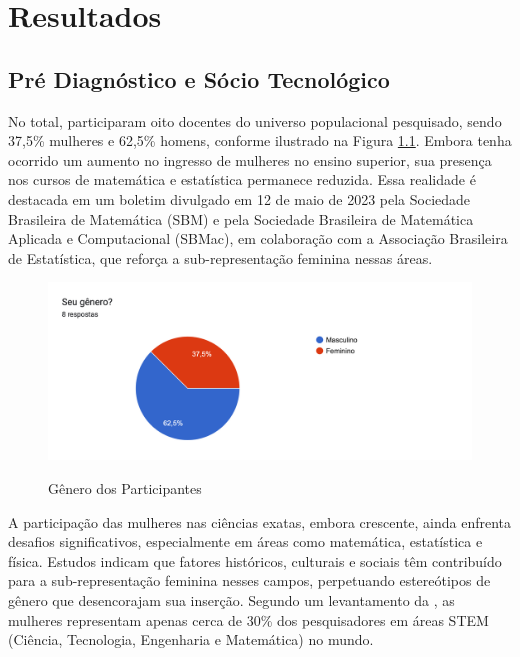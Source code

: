 \chapter{Resultados}
\label{resultados}



\section{Pré Diagnóstico e Sócio Tecnológico}
\label{pre_diagnostico_socio_tec}

No total, participaram oito docentes do universo populacional pesquisado, sendo 37,5\% mulheres e 62,5\% homens, conforme ilustrado na Figura \ref{fig:genero_participantes}. Embora tenha ocorrido um aumento no ingresso de mulheres no ensino superior, sua presença nos cursos de matemática e estatística permanece reduzida. Essa realidade é destacada em um boletim divulgado em 12 de maio de 2023 pela Sociedade Brasileira de Matemática (SBM) e pela Sociedade Brasileira de Matemática Aplicada e Computacional (SBMac), em colaboração com a Associação Brasileira de Estatística, que reforça a sub-representação feminina nessas áreas.

\begin{figure}[h!]
    \caption{Gênero dos Participantes}
    \centering
    \includegraphics[scale=0.2]{figuras/resultados/genero.png}
    \label{fig:genero_participantes}
\end{figure}

A participação das mulheres nas ciências exatas, embora crescente, ainda enfrenta desafios significativos, especialmente em áreas como matemática, estatística e física. Estudos indicam que fatores históricos, culturais e sociais têm contribuído para a sub-representação feminina nesses campos, perpetuando estereótipos de gênero que desencorajam sua inserção. Segundo um levantamento da \cite{brasil2018decifrar}, as mulheres representam apenas cerca de 30\% dos pesquisadores em áreas STEM (Ciência, Tecnologia, Engenharia e Matemática) no mundo.

